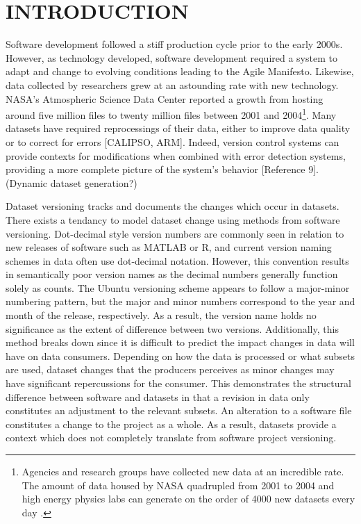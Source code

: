 
\chapter{INTRODUCTION}

Software development followed a stiff production cycle prior to the early 2000s.  However, as technology developed, software development required a system to adapt and change to evolving conditions leading to the Agile Manifesto.  Likewise, data collected by researchers grew at an astounding rate with new technology.  NASA's Atmospheric Science Data Center reported a growth from hosting around five million files to twenty million files between 2001 and 2004\footnote{Agencies and research groups have collected new data at an incredible rate.  The amount of data housed by NASA quadrupled from 2001 to 2004 \cite{barkstromLibrary} and high energy physics labs can generate on the order of 4000 new datasets every day \cite{ATLAS}.}.  Many datasets have required reprocessings of their data, either to improve data quality or to correct for errors [CALIPSO, ARM].  Indeed, version control systems can provide contexts for modifications when combined with error detection systems, providing a more complete picture of the system's behavior [Reference 9].  (Dynamic dataset generation?)

Dataset versioning tracks and documents the changes which occur in datasets.  There exists a tendancy to model dataset change using methods from software versioning.  Dot-decimal style version numbers are commonly seen in relation to new releases of software such as MATLAB or R, and current version naming schemes in data often use dot-decimal notation.  However, this convention results in semantically poor version names as the decimal numbers generally function solely as counts.  The Ubuntu versioning scheme appears to follow a major-minor numbering pattern, but the major and minor numbers correspond to the year and month of the release, respectively.  As a result, the version name holds no significance as the extent of difference between two versions.  Additionally, this method breaks down since it is difficult to predict the impact changes in data will have on data consumers.  Depending on how the data is processed or what subsets are used, dataset changes that the producers perceives as minor changes may have significant repercussions for the consumer.  This demonstrates the structural difference between software and datasets in that a revision in data only constitutes an adjustment to the relevant subsets.  An alteration to a software file constitutes a change to the project as a whole.  As a result, datasets provide a context which does not completely translate from software project versioning.



